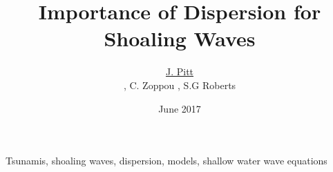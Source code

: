 \documentclass[a4paper,fleqn]{article} %
\begin{document}

\title{Importance of Dispersion for Shoaling Waves}
\author{\underline{J. Pitt} \address[ANU]{\it{Mathematical Sciences Institute, Australian National University, Canberra, ACT 0200, Australia}}, C. Zoppou \addressmark[ANU], S.G Roberts \addressmark[ANU]}



\date{June 2017}

\begin{keyword}
	Tsunamis, shoaling waves, dispersion, models, shallow water wave equations

\end{keyword}
\end{document}
